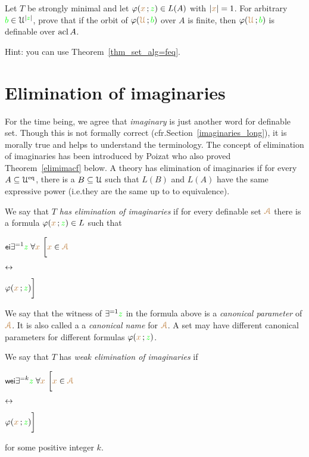 \documentclass[creche.tex]{subfiles}
\begin{document}
\begin{exercise}
Let $T$ be strongly minimal and let $\varphi({\color{brown} x}\,;{\color{green} z})\in L(A)$ with $|{\color{brown} x}|=1$. For arbitrary ${\color{green} b}\in\EuScript U^{|{\color{green} z}|}$, prove that if the orbit of $\varphi({\color{brown}\EuScript U}\,; {\color{green} b})$ over $A$ is finite, then $\varphi({\color{brown}\EuScript U}\,; {\color{green} b})$ is definable over $\mathop{\rm acl} A$.

Hint: you can use Theorem~\ref{thm_set_alg=feq}.\QED
\end{exercise}








\section{Elimination of imaginaries}\label{elimination_imaginaries}

\def\medrel#1{\parbox[t]{5ex}{$\displaystyle\hfil #1$}}
\def\ceq#1#2#3{\parbox[t]{30ex}{$\displaystyle #1$}\medrel{#2}{$\displaystyle #3$}}

For the time being, we agree that \textit{imaginary\/} is just another word for definable set. Though this is not formally correct (cfr.\@ Section~\ref{imaginaries_long}), it is morally true and helps to understand the terminology. The concept of elimination of imaginaries has been introduced by Poizat who also proved Theorem~\ref{elimimacf} below. A theory has elimination of imaginaries if for every $A\subseteq\EuScript U^{{\rm eq}}$, there is a $B\subseteq\EuScript U$ such that $L(B)$ and $L(A)$ have the same expressive power (i.e.\@ they are the same up to to equivalence).  

\begin{definition}\label{defelimanazioneimmaginari}
We say that \emph{$T$ has elimination of imaginaries\/} if for every definable set ${\color{brown}\EuScript A}$ there is a formula $\varphi({\color{brown} x}\,;{\color{green} z})\in L$ such that\smallskip

\ceq{\ssf{ei}\hfill\E^{=1} {\gr z}\;\A {\mr x}\ \bigg[{\mr x}\in{\vl\Aa}}{\iff}{\phi({\mr x}\,;{\gr z})\bigg]}

We say that the witness of $\exists^{=1}{\color{green} z}$ in the formula above is a \emph{canonical parameter\/} of ${\color{brown}\EuScript A}$. It is also called a a \emph{canonical name\/} for ${\color{brown}\EuScript A}$. A set may have different canonical parameters for different formulas $\varphi({\color{brown} x}\,;{\color{green} z})$.

We say that $T$ has \emph{weak elimination of imaginaries\/} if\smallskip

\ceq{\ssf{wei}\hfill\E^{=k} {\gr z}\;\A {\mr x}\ \bigg[{\mr x}\in{\vl\Aa}}{\iff}{\phi({\mr x}\,;{\gr z})\bigg]}

for some positive integer $k$.\QED
\end{definition}
\end{document}
